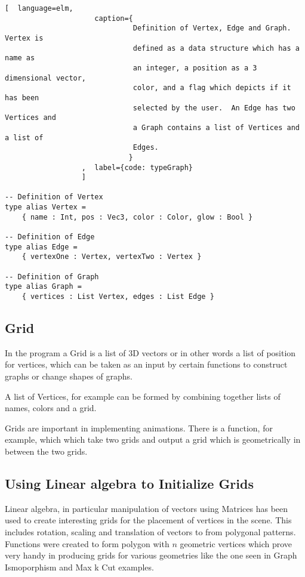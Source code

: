 \begin{lstlisting}[  language=elm, 
                     caption={
                              Definition of Vertex, Edge and Graph.  Vertex is
                              defined as a data structure which has a name as
                              an integer, a position as a 3 dimensional vector,
                              color, and a flag which depicts if it has been
                              selected by the user.  An Edge has two Vertices and
                              a Graph contains a list of Vertices and a list of
                              Edges.
                             }
                  ,  label={code: typeGraph}
                  ]

-- Definition of Vertex
type alias Vertex =
    { name : Int, pos : Vec3, color : Color, glow : Bool }

-- Definition of Edge
type alias Edge =
    { vertexOne : Vertex, vertexTwo : Vertex }

-- Definition of Graph
type alias Graph =
    { vertices : List Vertex, edges : List Edge }
\end{lstlisting}

\subsection{Grid}
In the program a Grid is a list of 3D vectors or in other words a list of
position for vertices, which can be taken as an input by certain functions to
construct graphs or change shapes of graphs. 

A list of Vertices, for example can be formed by combining together lists of
names, colors and a grid.

Grids are important in implementing animations. There is a function, for
example, which which take two grids and output a grid which is geometrically in
between the two grids.

\subsection{Using Linear algebra to Initialize Grids}
Linear algebra, in particular manipulation of vectors using Matrices has been
used to create interesting grids for the placement of vertices in the scene.
This includes rotation, scaling and translation of vectors to from polygonal
patterns. Functions were created to form polygon with $n$ geometric vertices
which prove very handy in producing grids for various geometries like
the one seen in Graph Ismoporphism and Max k Cut examples.


